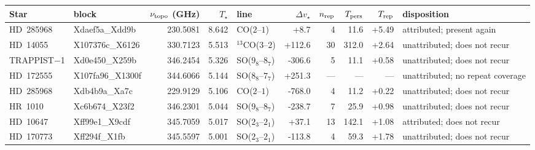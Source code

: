 \begin{tabular}{@{}l@{~}l@{~}r@{~}r@{~}l@{~}r@{~~}r@{~}r@{~}r@{~}l@{}}
\hline
Star & block & $\nu_{\rm topo}$ (GHz) & $T_\star$ & line & $\Delta v_\star$ & $n_{\rm rep}$ & $T_{\rm pers}$ & $T_{\rm rep}$ & disposition \\
\hline
HD~285968 & Xdaef5a\_Xdd9b & 230.5081 & 8.642 & CO($2$--$1$) & +8.7 & 4 & 11.6 & +5.49 & attributed; present again \\
HD~14055 & X107376c\_X6126 & 330.7123 & 5.513 & $^{13}$CO($3$--$2$) & +112.6 & 30 & 312.0 & +2.64 & unattributed; does not recur \\
TRAPPIST$-$1 & Xd0e450\_X259b & 346.2454 & 5.326 & SO($9_{8}$--$8_{7}$) & -306.6 & 5 & 11.1 & +0.58 & unattributed; does not recur \\
HD~172555 & X107fa96\_X1300f & 344.6066 & 5.144 & SO($8_{8}$--$7_{7}$) & +251.3 & --- & --- & --- & unattributed; no repeat coverage \\
HD~285968 & Xdb4b9a\_Xa7c & 229.9129 & 5.106 & CO($2$--$1$) & -768.0 & 4 & 11.2 & +0.22 & unattributed; does not recur \\
HR~1010 & Xc6b674\_X23f2 & 346.2301 & 5.044 & SO($9_{8}$--$8_{7}$) & -238.7 & 7 & 25.9 & +0.98 & unattributed; does not recur \\
HD~10647 & Xff99e1\_X9cdf & 345.7059 & 5.017 & SO($2_{3}$--$2_{1}$) & +37.1 & 13 & 142.1 & +1.08 & attributed; does not recur \\
HD~170773 & Xff294f\_X1fb & 345.5597 & 5.001 & SO($2_{3}$--$2_{1}$) & -113.8 & 4 & 59.3 & +1.78 & unattributed; does not recur \\
\hline
\end{tabular}
